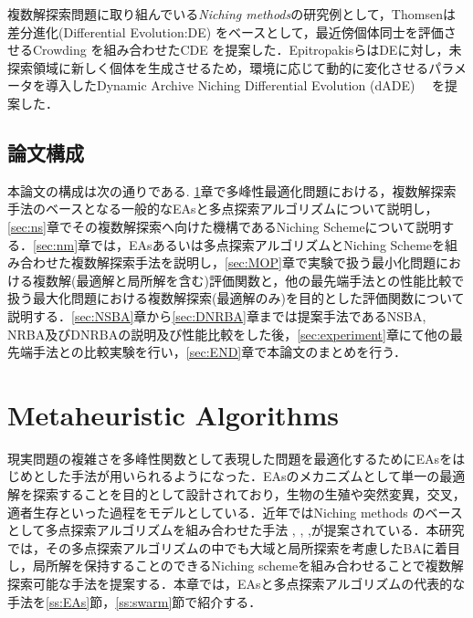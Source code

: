 \documentclass[a4j,11pt]{jarticle}
\begin{document}
複数解探索問題に取り組んでいる{\it Niching methods}の研究例として，Thomsenは差分進化(Differential Evolution:DE) \cite{DE} をベースとして，最近傍個体同士を評価させるCrowding \cite{Crowding} を組み合わせたCDE \cite{CDE} を提案した．EpitropakisらはDEに対し，未探索領域に新しく個体を生成させるため，環境に応じて動的に変化させるパラメータを導入したDynamic Archive Niching Differential Evolution (dADE)　\cite{dADE} を提案した．


\newpage
\subsection{論文構成}
本論文の構成は次の通りである.
\ref{sec:MA}章で多峰性最適化問題における，複数解探索手法のベースとなる一般的なEAsと多点探索アルゴリズムについて説明し，\ref{sec:ns}章でその複数解探索へ向けた機構であるNiching Schemeについて説明する．\ref{sec:nm}章では，EAsあるいは多点探索アルゴリズムとNiching Schemeを組み合わせた複数解探索手法を説明し，\ref{sec:MOP}章で実験で扱う最小化問題における複数解(最適解と局所解を含む)評価関数と，他の最先端手法との性能比較で扱う最大化問題における複数解探索(最適解のみ)を目的とした評価関数について説明する．\ref{sec:NSBA}章から\ref{sec:DNRBA}章までは提案手法であるNSBA, NRBA及びDNRBAの説明及び性能比較をした後，\ref{sec:experiment}章にて他の最先端手法との比較実験を行い，\ref{sec:END}章で本論文のまとめを行う．

\newpage
\section{Metaheuristic Algorithms}

\label{sec:MA}

現実問題の複雑さを多峰性関数として表現した問題を最適化するためにEAsをはじめとした手法が用いられるようになった．EAsのメカニズムとして単一の最適解を探索することを目的として設計されており，生物の生殖や突然変異，交叉，適者生存といった過程をモデルとしている．近年ではNiching methods のベースとして多点探索アルゴリズムを組み合わせた手法 \cite{dADE}, \cite{nea}, \cite{CDE},が提案されている．本研究では，その多点探索アルゴリズムの中でも大域と局所探索を考慮したBAに着目し，局所解を保持することのできるNiching schemeを組み合わせることで複数解探索可能な手法を提案する．本章では，EAsと多点探索アルゴリズムの代表的な手法を\ref{ss:EAs}節，\ref{ss:swarm}節で紹介する．
\end{document}
